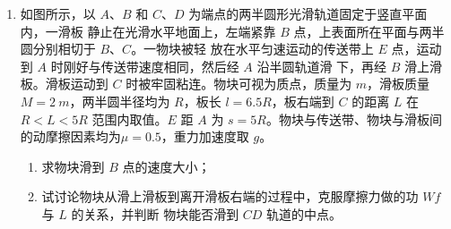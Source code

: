 \begin{enumerate}
{\begin{enumerate}
\end{enumerate}


}


\newpage
\item 
{}
如图所示，以 $ A $、$ B $ 和 $ C $、$ D $ 为端点的两半圆形光滑轨道固定于竖直平面内，一滑板
静止在光滑水平地面上，左端紧靠 $ B $ 点，上表面所在平面与两半圆分别相切于 $ B $、$ C $。一物块被轻
放在水平匀速运动的传送带上 $ E $ 点，运动到 $ A $ 时刚好与传送带速度相同，然后经 $ A $ 沿半圆轨道滑
下，再经 $ B $ 滑上滑板。滑板运动到 $ C $ 时被牢固粘连。物块可视为质点，质量为 $ m $，滑板质量
$ M=2 \ m $，两半圆半径均为 $ R $，板长 $ l=6.5R $，板右端到 $ C $ 的距离 $ L $ 在 $ R < L < 5R $ 范围内取值。$ E $ 距 $ A $
为 $ s=5R $。物块与传送带、物块与滑板间的动摩擦因素均为$ \mu =0.5 $，重力加速度取 $ g $。
\begin{enumerate}
\renewcommand{\labelenumi}{\arabic{enumi}.}
\item
求物块滑到 $ B $ 点的速度大小；
\item 
试讨论物块从滑上滑板到离开滑板右端的过程中，克服摩擦力做的功 $ Wf $ 与 $ L $ 的关系，并判断
物块能否滑到 $ CD $ 轨道的中点。



\end{enumerate}
\begin{figure}[h!]
\flushright

\end{figure}





\end{enumerate}

